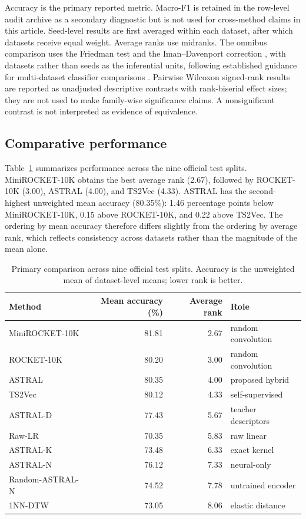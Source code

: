 \documentclass[pdflatex,sn-mathphys-num]{sn-jnl}
\newcommand{\1}{\mathbf{1}}
\theoremstyle{plain}
\begin{document}
	Accuracy is the primary reported metric. Macro-F1 is retained in the row-level audit archive as a secondary diagnostic but is not used for cross-method claims in this article. Seed-level results are first averaged within each dataset, after which datasets receive equal weight. Average ranks use midranks. The omnibus comparison uses the Friedman test and the Iman--Davenport correction \cite{iman1980friedman}, with datasets rather than seeds as the inferential units, following established guidance for multi-dataset classifier comparisons \cite{demsar2006statistics}. Pairwise Wilcoxon signed-rank results are reported as unadjusted descriptive contrasts with rank-biserial effect sizes; they are not used to make family-wise significance claims. A nonsignificant contrast is not interpreted as evidence of equivalence.
	
	\subsection{Comparative performance}
	
	Table~\ref{tab:mainresults} summarizes performance across the nine official test splits. MiniROCKET-10K obtains the best average rank (2.67), followed by ROCKET-10K (3.00), ASTRAL (4.00), and TS2Vec (4.33). ASTRAL has the second-highest unweighted mean accuracy (80.35\%): 1.46 percentage points below MiniROCKET-10K, 0.15 above ROCKET-10K, and 0.22 above TS2Vec. The ordering by mean accuracy therefore differs slightly from the ordering by average rank, which reflects consistency across datasets rather than the magnitude of the mean alone.
	
	\begin{table}[htbp]
		\centering
		\caption{Primary comparison across nine official test splits. Accuracy is the unweighted mean of dataset-level means; lower rank is better.}
		\label{tab:mainresults}
		\small
		\begin{tabular}{lrrl}
			\toprule
			Method & Mean accuracy (\%) & Average rank & Role \\
			\midrule
			MiniROCKET-10K & 81.81 & 2.67 & random convolution \\
			ROCKET-10K & 80.20 & 3.00 & random convolution \\
			ASTRAL & 80.35 & 4.00 & proposed hybrid \\
			TS2Vec & 80.12 & 4.33 & self-supervised \\
			ASTRAL-D & 77.43 & 5.67 & teacher descriptors \\
			Raw-LR & 70.35 & 5.83 & raw linear \\
			ASTRAL-K & 73.48 & 6.33 & exact kernel \\
			ASTRAL-N & 76.12 & 7.33 & neural-only \\
			Random-ASTRAL-N & 74.52 & 7.78 & untrained encoder \\
			1NN-DTW & 73.05 & 8.06 & elastic distance \\
			\bottomrule
		\end{tabular}
	\end{table}
\end{document}
